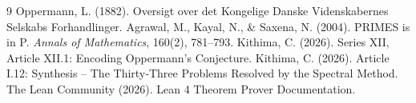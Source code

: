 \documentclass[11pt,a4paper]{article}
\begin{document}

\begin{thebibliography}{9}
  Oppermann, L. (1882). Oversigt over det Kongelige Danske Videnskabernes Selskabs Forhandlinger.
  Agrawal, M., Kayal, N., \& Saxena, N. (2004). PRIMES is in P. \emph{Annals of Mathematics}, 160(2), 781–793.
  Kithima, C. (2026). Series XII, Article XII.1: Encoding Oppermann's Conjecture.
  Kithima, C. (2026). Article I.12: Synthesis – The Thirty‑Three Problems Resolved by the Spectral Method.
  The Lean Community (2026). Lean 4 Theorem Prover Documentation.
\end{thebibliography}
\end{document}
